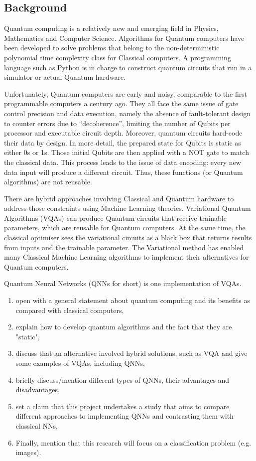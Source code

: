 \subsection{Background}
Quantum computing is a relatively new and emerging field in Physics, Mathematics and Computer Science. 
Algorithms for Quantum computers have been developed to solve problems that belong to the non-deterministic polynomial time complexity class for Classical computers. 
A programming language such as Python is in charge to construct quantum circuits that run in a simulator or actual Quantum hardware. 

Unfortunately, Quantum computers are early and noisy, comparable to the first programmable computers a century ago. 
They all face the same issue of gate control precision and data execution, namely the absence of fault-tolerant design to counter errors due to “decoherence”, limiting the number of Qubits per processor and executable circuit depth. 
Moreover, quantum circuits hard-code their data by design. In more detail, the prepared state for Qubits is static as either 0s or 1s. 
Those initial Qubits are then applied with a NOT gate to match the classical data. This process leads to the issue of data encoding: every new data input will produce a different circuit. 
Thus, these functions (or Quantum algorithms) are not reusable.

There are hybrid approaches involving Classical and Quantum hardware to address those constraints using Machine Learning theories. 
Variational Quantum Algorithms (VQAs) can produce Quantum circuits that receive trainable parameters, which are reusable for Quantum computers. 
At the same time, the classical optimiser sees the variational circuits as a black box that returns results from inputs and the trainable parameter. 
The Variational method has enabled many Classical Machine Learning algorithms to implement their alternatives for Quantum computers.

Quantum Neural Networks (QNNs for short) is one implementation of VQAs.


\begin{enumerate}
    \item open with a general statement about quantum computing and its benefits as compared with classical computers, 
    \item explain how to  develop quantum algorithms and the fact that they are "static",
    \item discuss that an alternative involved hybrid solutions, such as VQA and give some examples of VQAs, including QNNs, 
    \item briefly discuss/mention different types of QNNs, their advantages and disadvantages, 
    \item set a claim that this project undertakes a study that aims to compare different approaches to implementing QNNs and contrasting them with classical NNs, 
    \item Finally, mention that this research will focus on a classification problem (e.g. images).
\end{enumerate}